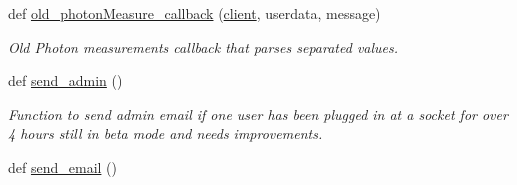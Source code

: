 \begin{DoxyCompactItemize}
def \hyperlink{namespace_s_q_lfunction_ab58c55eebaf8990eb9c810968db1dc50}{old\+\_\+photon\+Measure\+\_\+callback} (\hyperlink{namespace_s_q_lfunction_ac9fb782d6f6dcc44fd19ea1b135ab996}{client}, userdata, message)
\begin{DoxyCompactList}\small\item\em Old Photon measurements callback that parses \textquotesingle{}\textquotesingle{} separated values. \end{DoxyCompactList}\item 
def \hyperlink{namespace_s_q_lfunction_a75af8b1bb1aa60f32418ac7901b0060b}{send\+\_\+admin} ()
\begin{DoxyCompactList}\small\item\em Function to send admin email if one user has been plugged in at a socket for over 4 hours still in beta mode and needs improvements. \end{DoxyCompactList}\item 
def \hyperlink{namespace_s_q_lfunction_a526fa5bc764d15233b0cc1880fc33f83}{send\+\_\+email} ()
\end{DoxyCompactItemize}
